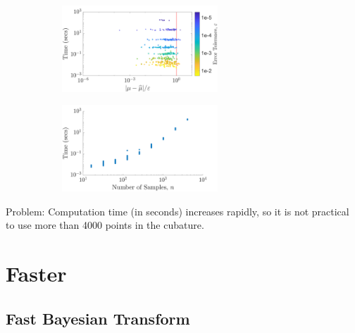 \documentclass[handout, 10pt,compress,xcolor={usenames,dvipsnames}]{beamer} %
\begin{document}
\begin{frame}
\begin{figure}[htp]
\captionsetup[subfigure]{labelformat=empty}
\centering
\begin{subfigure}[b]{0.49\textwidth}
\includegraphics[height=3.25cm]{../figures/MVN_guaranteed_time_Matern_d2_2019-Jun-29}
\end{subfigure}
\centering
\begin{subfigure}[b]{0.49\textwidth}
\includegraphics[height=3.25cm]{../figures/MVN_rapid_n_vs_time_Matern_d2_2019-Jun-29}
\end{subfigure}
\label{fig:MVN_Metern_d2b2}
\end{figure}
\alert{Problem}: Computation time (in seconds) increases rapidly, so it is not practical to use more than 4000 points in the cubature.
\end{frame}
















\section{Faster}



\subsection{Fast Bayesian Transform}
\end{document}
